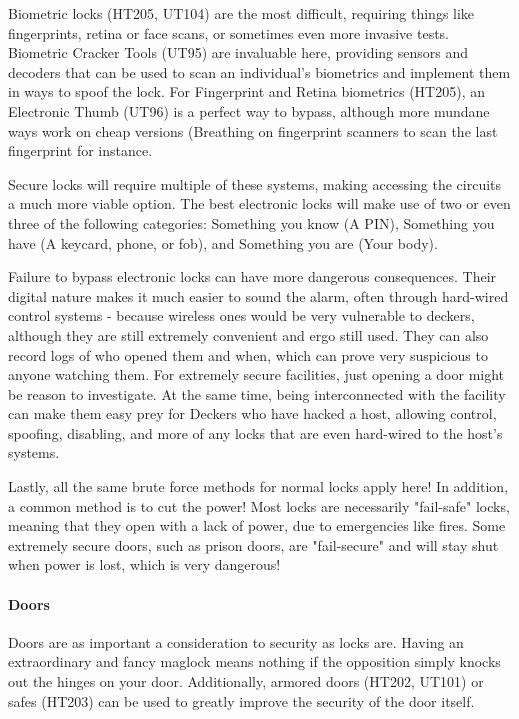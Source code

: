 \begin{multicols}{2}
	Biometric locks (HT205, UT104) are the most difficult, requiring things like fingerprints, retina or face scans, or sometimes even more invasive tests. Biometric Cracker Tools (UT95) are invaluable here, providing sensors and decoders that can be used to scan an individual's biometrics and implement them in ways to spoof the lock. For Fingerprint and Retina biometrics (HT205), an Electronic Thumb (UT96) is a perfect way to bypass, although more mundane ways work on cheap versions (Breathing on fingerprint scanners to scan the last fingerprint for instance.
	
	Secure locks will require multiple of these systems, making accessing the circuits a much more viable option. The best electronic locks will make use of two or even three of the following categories: Something you know (A PIN), Something you have (A keycard, phone, or fob), and Something you are (Your body).
	
	Failure to bypass electronic locks can have more dangerous consequences. Their digital nature makes it much easier to sound the alarm, often through hard-wired control systems - because wireless ones would be very vulnerable to deckers, although they are still extremely convenient and ergo still used. They can also record logs of who opened them and when, which can prove very suspicious to anyone watching them. For extremely secure facilities, just opening a door might be reason to investigate. At the same time, being interconnected with the facility can make them easy prey for Deckers who have hacked a host, allowing control, spoofing, disabling, and more of any locks that are even hard-wired to the host's systems.
	
	Lastly, all the same brute force methods for normal locks apply here! In addition, a common method is to cut the power! Most locks are necessarily "fail-safe" locks, meaning that they open with a lack of power, due to emergencies like fires. Some extremely secure doors, such as prison doors, are "fail-secure" and will stay shut when power is lost, which is very dangerous!
	
	\paragraph{Doors}
	
	Doors are as important a consideration to security as locks are. Having an extraordinary and fancy maglock means nothing if the opposition simply knocks out the hinges on your door. Additionally, armored doors (HT202, UT101) or safes (HT203) can be used to greatly improve the security of the door itself.
	

\end{multicols}

